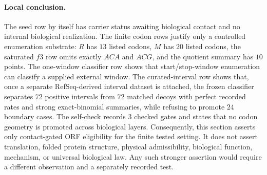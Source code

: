 \paragraph{Local conclusion.}
The seed row by itself has carrier status awaiting biological contact and no internal biological realization.  The finite codon rows justify only a controlled enumeration substrate: $R$ has $13$ listed codons, $M$ has $20$ listed codons, the saturated $f3$ row omits exactly $ACA$ and $ACG$, and the quotient summary has $10$ points.  The one-window classifier row shows that start/stop-window enumeration can classify a supplied external window.  The curated-interval row shows that, once a separate RefSeq-derived interval dataset is attached, the frozen classifier separates $72$ positive intervals from $72$ matched decoys with perfect recorded rates and strong exact-binomial summaries, while refusing to promote $24$ boundary cases.  The self-check records $3$ checked gates and states that no codon geometry is promoted across biological layers.  Consequently, this section asserts only contact-gated ORF eligibility for the finite tested setting.  It does not assert translation, folded protein structure, physical admissibility, biological function, mechanism, or universal biological law.  Any such stronger assertion would require a different observation and a separately recorded test.
